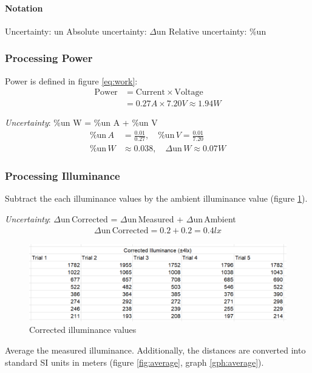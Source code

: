 \documentclass[a4paper,12pt]{article}
\newcommand{\absun}{\Delta \text{un}\,}
\newcommand{\relun}{\% \text{un}\,}
\begin{document}
\paragraph{Notation}

Uncertainty: un \quad Absolute uncertainty: $\Delta$un \quad Relative uncertainty: \%un


\subsubsection*{Processing Power}
Power is defined in figure \ref{eq:work}:
\begin{align*}
\text{Power} &= \text{Current} \times \text{Voltage}\\
        &= 0.27\si{A} \times 7.20\si{V} \approx 1.94 \si{W}
\end{align*}

\textit{Uncertainty}: \%un W = \%un A + \%un V
\begin{align*}
    \relun A &= \frac{0.01}{0.27},\quad \relun V = \frac{0.01}{7.20}\\
    \relun W &\approx 0.038,\quad \absun W \approx 0.07W
\end{align*}


\subsubsection*{Processing Illuminance}
Subtract the each illuminance values by the ambient illuminance value (figure \ref{fig:corrected}).

\textit{Uncertainty}: $\absun$Corrected = $\absun$Measured + $\absun$Ambient
\begin{align*}
     \absun \text{Corrected} = 0.2 + 0.2 = 0.4\si{lx}
\end{align*}

\begin{figure}[h!]
    \centering
    \includegraphics[scale=0.5]{assets/correcteddata.png}
    \caption{Corrected illuminance values}
    \label{fig:corrected}
\end{figure}

Average the measured illuminance. Additionally, the distances are converted into standard SI units in meters (figure \ref{fig:average}, graph \ref{gph:average}).
\end{document}
